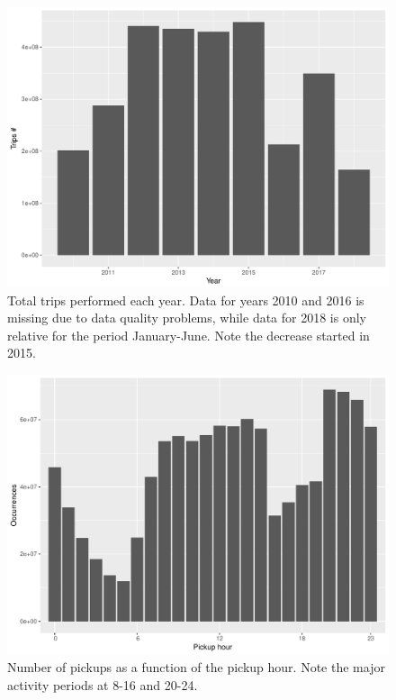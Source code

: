 \documentclass{acm_proc_article-sp-sigmod09}
\begin{document}
\begin{figure}
	\centering
	\includegraphics[width=1\columnwidth]{resources/base_plots/travels_by_year.pdf}
	\caption{Total trips performed each year. Data for years 2010 and 2016 is missing due to data quality problems, while data for 2018 is only relative for the period January-June. Note the decrease started in 2015.}
	\label{fig:travelsByYear}
\end{figure}

\begin{figure}
	\centering
	\includegraphics[width=1\columnwidth]{resources/base_plots/pickup_hour_dist.pdf}
	\caption{Number of pickups as a function of the pickup hour. Note the major activity periods at 8-16 and 20-24.}
	\label{fig:pickupHourDist}
\end{figure}
\end{document}
